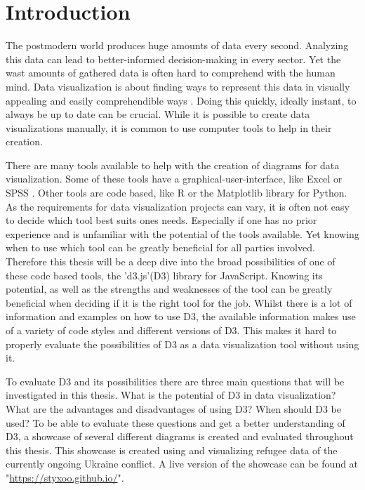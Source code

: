 \chapter{Introduction}

The postmodern world produces huge amounts of data every second. Analyzing this data can lead to better-informed decision-making in every sector. Yet the wast amounts of gathered data is often hard to comprehend with the human mind. Data visualization is about finding ways to represent this data in visually appealing and easily comprehendible ways \cite{sadiku2016data}. Doing this quickly, ideally instant, to always be up to date can be crucial. While it is possible to create data visualizations manually, it is common to use computer tools to help in their creation.

There are many tools available to help with the creation of diagrams for data visualization. Some of these tools have a graphical-user-interface, like Excel \cite{excel} or SPSS \cite{spss}. Other tools are code based, like R \cite{r} or the Matplotlib \cite{matplotlib} library for Python. As the requirements for data visualization projects can vary, it is often not easy to decide which tool best suits ones needs. Especially if one has no prior experience and is unfamiliar with the potential of the tools available. Yet knowing when to use which tool can be greatly beneficial for all parties involved. Therefore this thesis will be a deep dive into the broad possibilities of one of these code based tools, the 'd3.js'(D3) library for JavaScript. Knowing its potential, as well as the strengths and weaknesses of the tool can be greatly beneficial when deciding if it is the right tool for the job. Whilst there is a lot of information and examples on how to use D3, the available information makes use of a variety of code styles and different versions of D3. This makes it hard to properly evaluate the possibilities of D3 as a data visualization tool without using it.

To evaluate D3 and its possibilities there are three main questions that will be investigated in this thesis. What is the potential of D3 in data visualization? What are the advantages and disadvantages of using D3? When should D3 be used? To be able to evaluate these questions and get a better understanding of D3, a showcase of several different diagrams is created and evaluated throughout this thesis. This showcase is created using and visualizing refugee data of the currently ongoing Ukraine conflict. A live version of the showcase can be found at "\url{https://styxoo.github.io/}".

